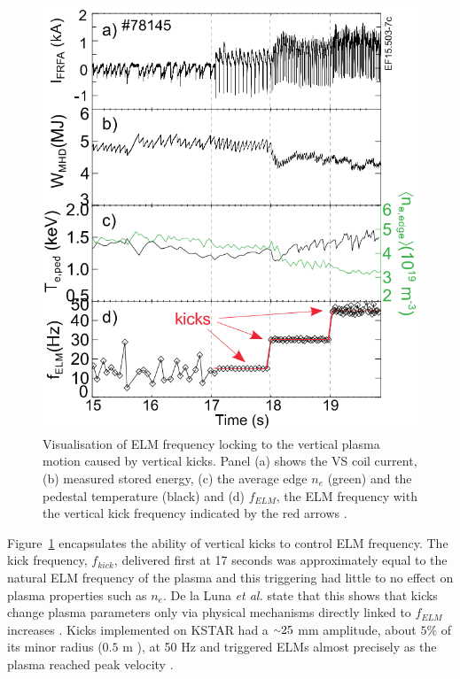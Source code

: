 \documentclass[11pt, twocolumn]{article}  %
\providecommand{\squiggle}{\raise.17ex\hbox{$\scriptstyle\sim$}} %
\begin{document}
\begin{figure}
\includegraphics[scale=0.433]{Figures/VKdata.PNG}
\centering
\caption{Visualisation of ELM frequency locking to the vertical plasma motion caused by vertical kicks. Panel (a) shows the VS coil current, (b) measured stored energy, (c) the average edge $n_e$ (green) and the pedestal temperature (black) and (d) $f_{ELM}$, the ELM frequency with the vertical kick frequency indicated by the red arrows \cite{DelaLuna2016}.}\label{fig:VKdata}
\end{figure}

Figure~\ref{fig:VKdata} encapsulates the ability of vertical kicks to control ELM frequency. The kick frequency, $f_{kick}$, delivered first at 17 seconds was approximately equal to the natural ELM frequency of the plasma and this triggering had little to no effect on plasma properties such as $n_e$. De la Luna \textit{et al.} state that this shows that kicks change plasma parameters only via physical mechanisms directly linked to $f_{ELM}$ increases \cite{DelaLuna2016}. Kicks implemented on KSTAR had a $\squiggle 25$ mm amplitude, about $5\%$ of its minor radius ($0.5$ m \cite{Choi1998}), at 50 Hz and triggered ELMs almost precisely as the plasma reached peak velocity \cite{Kim2012}.
\end{document}
